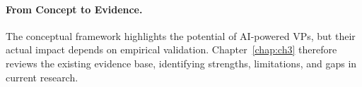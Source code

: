 \paragraph{From Concept to Evidence.}
The conceptual framework highlights the potential of AI-powered VPs, but their
actual impact depends on empirical validation. Chapter~\ref{chap:ch3} therefore
reviews the existing evidence base, identifying strengths, limitations, and
gaps in current research.

